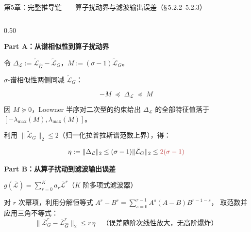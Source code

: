 \documentclass[aspectratio=169,9pt,xcolor=dvipsnames]{beamer}
\newcommand{\blue}[1]{\textcolor{mynavy}{#1}}
\begin{document}
\begin{frame}{第5章：完整推导链——算子扰动界与滤波输出误差（§\,5.2.2--5.2.3）}
\begin{columns}[T]

\begin{column}{0.50\textwidth}
  {\small
  \textbf{\blue{Part A：从谱相似性到算子扰动界}}

  令 $\Delta_{\mathcal{L}}:=\tilde{\mathcal{L}}_{\hat{G}}-\tilde{\mathcal{L}}_G$，$M:=(\sigma-1)\tilde{\mathcal{L}}_G$。

  $\sigma$-谱相似性两侧同减 $\tilde{\mathcal{L}}_G$：
  

  \begin{equation*}
    -M\;\preceq\;\Delta_{\mathcal{L}}\;\preceq\; M
  \end{equation*}


  因 $M\succeq 0$，Loewner 半序对二次型的约束给出 $\Delta_{\mathcal{L}}$ 的全部特征值落于 $[-\lambda_{\max}(M),\lambda_{\max}(M)]$。

  利用 $\|\tilde{\mathcal{L}}_G\|_2\le 2$（归一化拉普拉斯谱范数上界），得：
  

  \begin{equation*}
    \eta:=\|\Delta_{\mathcal{L}}\|_2
    \le(\sigma-1)\|\tilde{\mathcal{L}}_G\|_2
    \le{\color{myred}2(\sigma-1)}
  \end{equation*}


  \vspace{0.2cm}
  \textbf{\blue{Part B：从算子扰动到滤波输出误差}}

  $g(\bar{\mathcal{L}})=\sum_{r=0}^{K}a_r\bar{\mathcal{L}}^r$（$K$ 阶多项式滤波器）

  对 $r$ 次幂项，利用分解恒等式
  $A^r-B^r=\sum_{s=0}^{r-1}A^s(A-B)B^{r-1-s}$，
  取范数并应用三角不等式：
  \begin{equation*}
    \|\bar{\mathcal{L}}_G^r-\bar{\mathcal{L}}_{\hat{G}}^r\|_2\le r\,\eta
    \quad\text{（误差随阶次线性放大，无高阶爆炸）}
  \end{equation*}

}
\end{column}
\end{columns}
\end{frame}
\end{document}
